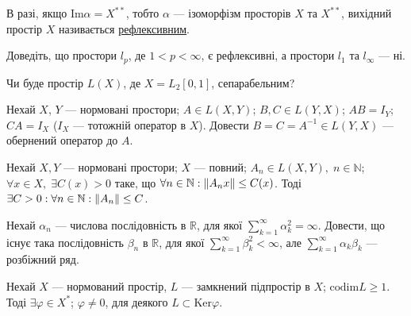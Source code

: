 \begin{theory}
    В разі, якщо $\mathrm{Im}\alpha = X^{**}$, тобто $\alpha$ --- ізоморфізм просторів $X$ та $X^{**}$,
    вихідний простір $X$ називається \underline{рефлексивним}.
\end{theory}

\begin{exercise}
    Доведіть, що простори  $l_p$, де $1<p<\infty$, є рефлексивні, а простори $l_1$ та $l_\infty$ --- ні.
\end{exercise}

\begin{exercise}
    Чи буде простір $L(X)$, де $X=L_2[0,1]$, сепарабельним?
\end{exercise}

\begin{exercise}
    Нехай $X$, $Y$ --- нормовані простори; $A \in L\left( X, Y\right)$; $B, C \in L\left( Y, X\right)$;
    $AB = I_Y$; $CA = I_X$ ($I_X$ --- тотожній оператор в $X$).
    Довести $B = C = A^{-1} \in L\left( Y, X\right)$ --- обернений оператор до $A$.
\end{exercise}

\begin{theory}
    \begin{theorem*}
        Нехай $X, Y$ --- нормовані простори; $X$ --- повний; $A_n \in L\left( X, Y\right),\; n\in \mathbb{N}$;
        $\forall x \in X, \; \exists C(x) > 0$ таке, що $\forall n \in \mathbb{N}: \left\lVert A_n x\right\rVert \leq C(x)$.
        Тоді $\exists C>0: \forall n \in \mathbb{N}: \left\lVert A_n\right\rVert \leq C$.
    \end{theorem*}
\end{theory}

\begin{exercise}
    Нехай $\alpha_n$ --- числова послідовність в $\mathbb{R}$, для якої 
    $\sum\limits^\infty_{k=1} \alpha^2_k =\infty$. Довести, що існує така послідовність 
    $\beta_n$ в $\mathbb{R}$, для якої $\sum\limits^\infty_{k=1} \beta^2_k < \infty$, 
    але $\sum\limits^\infty_{k=1} \alpha_k\beta_k$ --- розбіжний ряд.
\end{exercise}

\begin{exercise}
    Нехай $X$ --- нормований простір, $L$ --- замкнений підпростір в $X$; $\mathrm{codim}L \geq 1$.
    Тоді $\exists \varphi \in X^*$; $\varphi \neq 0$, для деякого $L \subset \mathrm{Ker}\varphi$.
\end{exercise}

